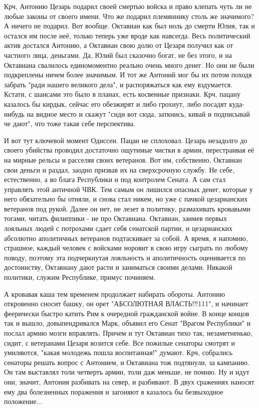 Крч, Антонию Цезарь подарил своей смертью войска и право клепать чуть ли не любые законы от своего имени. Что же подарил племяннику столь же значимого? А ничего не подарил. Вот вообще. Октавиан как был ноль до смерти Юлия, так и остался им после неё, только теперь уже вроде как навсегда. Весь политический актив достался Антонию, а Октавиан свою долю от Цезаря получил как от частного лица, деньгами. Да, Юлий был сказочно богат, не без этого, и на Октавиана свалилось единомоментно реально очень много денег. Но они не были подкреплены ничем более значимым. И тот же Антоний мог бы их потом походя забрать "ради нашего великого дела", и распоряжаться как ему вздумается. Кстати, с шансами это было в планах, есть косвенные признаки. Крч, пацану казалось бы кирдык, сейчас его обезжирят и либо грохнут, либо посадят куда-нибудь на видное место и скажут "сиди вот сюда, заткнись, кивай и подписывай че дают", что тоже такая себе перспектива.


И вот тут ключевой момент Одиссеи. Пацан не сплоховал. Цезарь незадолго до своего убийства проводил достаточно ощутимые чистки в армии, перестраивая её на мирные рельсы и расселяя своих ветеранов. Вот им, собственно, Октавиан свои деньги и раздал, заодно призвав их на сверхсрочную службу. Не себе, естественно, а во блага Республики и под контролем Сената. А сам стал управлять этой античной ЧВК. Тем самым он лишился опасных денег, которые у него обязательно бы отняли, и снова стал никем, но уже с пачкой цезарианских ветеранов под рукой. Далее он нет, не лезет в политику, размахивать кровавыми тогами, читать филиппики - не про Октавиана. Октавиан, заимев первых лояльных людей с потрохами сдает себя сенатской партии, и цезарианских абсолютно аполитичных ветеранов подтаскивает за собой. А время, я напомню, страшное, каждый человек с войсками норовит в свою игру сыграть по любому поводу, поэтому эта подчеркнутая лояльность и аполитичность оценивается по достоинству, Октавиану дают расти и заниматься своими делами. Никакой политики, служим Республике, примус починяем.


А кровавая каша тем временем продолжает набирать обороты. Антонию откровенно сносит башку, он орет "АБСОЛЮТНАЯ ВЛАСТЬ!!!111", и начинает феерически быстро катить Рим к очередной гражданской войне. В конце концов так и вышло, довыпендривался Марк, объявил его Сенат "Врагом Республики" и послал армию мозги вправлять. Причем и тут Октавиан тихо так, незаметненько, сидит, с ветеранами Цезаря возится себе. Все пожилые сенаторы смотрят и умиляются, "какая молодежь пошла воспитанная!" думают. Крч, собрались сенаторы решать вопрос с Антонием, и Октавиана тож подтянули, за кампанию. Он там выставлял толи четверть армии, толи даж меньше, не помню. Ну и идут они, значит, Антония разбивать на север, и разбивают. В двух сражениях наносят ему два болезненных поражения и загоняют в казалось бы безвыходное положение...


